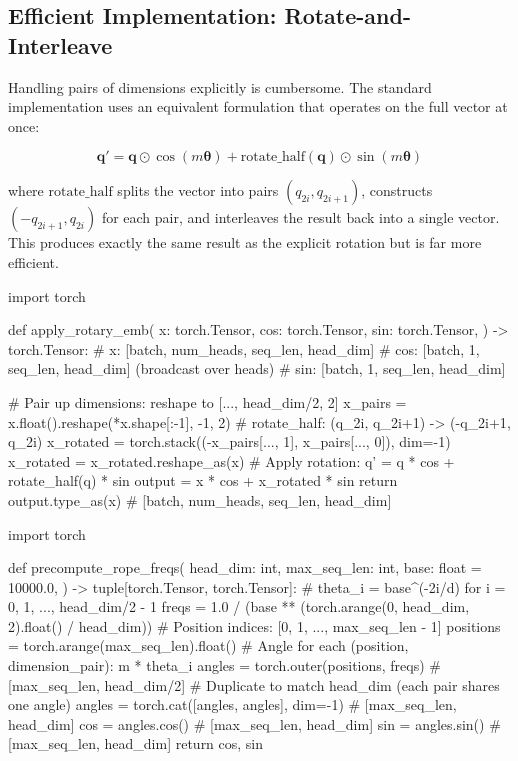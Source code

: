 \subsection{Efficient Implementation: Rotate-and-Interleave}

Handling pairs of dimensions explicitly is cumbersome. The standard
implementation uses an equivalent formulation that operates on the full
vector at once:

\[
  \mathbf{q}' = \mathbf{q} \odot \cos(m\boldsymbol{\theta}) + \text{rotate\_half}(\mathbf{q}) \odot \sin(m\boldsymbol{\theta})
\]

where $\text{rotate\_half}$ splits the vector into pairs
$(q_{2i}, q_{2i+1})$, constructs $(-q_{2i+1}, q_{2i})$ for each pair, and
interleaves the result back into a single vector. This produces exactly the
same result as the explicit rotation but is far more efficient.

\begin{pseudocode}
import torch

def apply_rotary_emb(
    x: torch.Tensor,
    cos: torch.Tensor,
    sin: torch.Tensor,
) -> torch.Tensor:
    # x:   [batch, num_heads, seq_len, head_dim]
    # cos: [batch, 1, seq_len, head_dim]  (broadcast over heads)
    # sin: [batch, 1, seq_len, head_dim]

    # Pair up dimensions: reshape to [..., head_dim/2, 2]
    x_pairs = x.float().reshape(*x.shape[:-1], -1, 2)
    # rotate_half: (q_2i, q_{2i+1}) -> (-q_{2i+1}, q_2i)
    x_rotated = torch.stack((-x_pairs[..., 1], x_pairs[..., 0]), dim=-1)
    x_rotated = x_rotated.reshape_as(x)
    # Apply rotation: q' = q * cos + rotate_half(q) * sin
    output = x * cos + x_rotated * sin
    return output.type_as(x)  # [batch, num_heads, seq_len, head_dim]
\end{pseudocode}

\begin{pseudocode}
import torch

def precompute_rope_freqs(
    head_dim: int,
    max_seq_len: int,
    base: float = 10000.0,
) -> tuple[torch.Tensor, torch.Tensor]:
    # theta_i = base^(-2i/d) for i = 0, 1, ..., head_dim/2 - 1
    freqs = 1.0 / (base ** (torch.arange(0, head_dim, 2).float() / head_dim))
    # Position indices: [0, 1, ..., max_seq_len - 1]
    positions = torch.arange(max_seq_len).float()
    # Angle for each (position, dimension_pair): m * theta_i
    angles = torch.outer(positions, freqs)  # [max_seq_len, head_dim/2]
    # Duplicate to match head_dim (each pair shares one angle)
    angles = torch.cat([angles, angles], dim=-1)  # [max_seq_len, head_dim]
    cos = angles.cos()  # [max_seq_len, head_dim]
    sin = angles.sin()  # [max_seq_len, head_dim]
    return cos, sin
\end{pseudocode}

